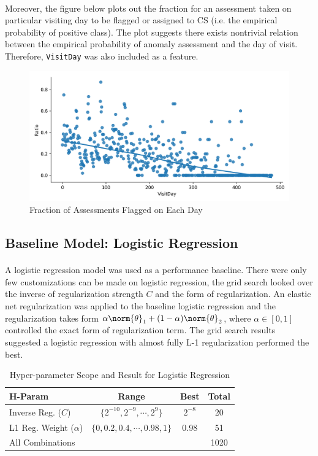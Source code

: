 \documentclass[11pt]{article}
\begin{document}
	\paragraph{} Moreover, the figure below plots out the fraction for an assessment taken on particular visiting day to be flagged or assigned to CS (i.e. the empirical probability of positive class). The plot suggests there exists nontrivial relation between the empirical probability of anomaly assessment and the day of visit. Therefore, \texttt{VisitDay} was also included as a feature.
	\begin{figure}[H]
		\centering
		\includegraphics[width=0.7\linewidth]{figures/alert_ratio_days.png}
		\caption{Fraction of Assessments Flagged on Each Day}
	\end{figure}
	
	\subsection{Baseline Model: Logistic Regression}
	\paragraph{} A logistic regression model was used as a performance baseline. There were only few customizations can be made on logistic regression, the grid search looked over the inverse of regularization strength $C$ and the form of regularization. An elastic net regularization was applied to the baseline logistic regression and the regularization takes form $\alpha \norm{\theta}_1 + (1 - \alpha) \norm{\theta}_2$, where $\alpha \in [0, 1]$ controlled the exact form of regularization term. The grid search results suggested a logistic regression with almost fully L-1 regularization performed the best.
	\begin{table}[H]
		\centering
		\begin{tabular}{l|c|c|c}
		H-Param & Range & Best & Total \\
 		\hline
 		Inverse Reg. ($C$) & $\{2^{-10}, 2^{-9}, \cdots, 2^9\}$ & $2^{-8}$ & 20 \\
 		L1 Reg. Weight ($\alpha$) & $\{0, 0.2, 0.4, \cdots, 0.98, 1\}$ & 0.98 & 51 \\
 		\hline
 		All Combinations & & & 1020 
		\end{tabular}
		\caption{Hyper-parameter Scope and Result for Logistic Regression}
	\end{table}
 	
\end{document}
